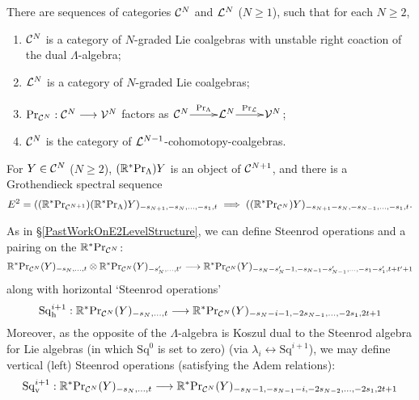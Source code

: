 \documentclass[11pt]{article}
\newcommand{\Sq}{\mathrm{Sq}}
\begin{document}
\begin{prop}
There are sequences of categories $\mathcal{C}^N$ and $\mathcal{L}^N$ ($N\geq1$), such that for each $N\geq2$, 
\begin{enumerate}\squishlist
\setlength{\parindent}{.25in}
\item $\mathcal{C}^N$ is a category of $N$-graded Lie coalgebras with unstable right coaction of the dual $\Lambda$-algebra;
\item $\mathcal{L}^N$ is a category of $N$-graded Lie coalgebras;
\item $\textup{Pr}_{\mathcal{C}^N}:\mathcal{C}^N\longrightarrow\mathcal{V}^N$ factors as $\xymatrix@R=4mm@1{
\calC^N\ar[r]^-{\textup{Pr}_\Lambda}
&%
\calL^N\ar[r]^-{\textup{Pr}_\calL}
&%
\calV^N%
}$;
\item $\mathcal{C}^N$ is the category of $\mathcal{L}^{N-1}$-cohomotopy-coalgebras.
\end{enumerate}
For $Y\in\mathcal{C}^N$ ($N\geq2$), $(\mathbb{R}^*\textup{Pr}_\Lambda)Y$ is an object of $\mathcal{C}^{N+1}$, and there is a Grothendieck spectral sequence
\[E^2=((\mathbb{R}^{*}\textup{Pr}_{\mathcal{C}^{N+1}})(\mathbb{R}^*\textup{Pr}_\Lambda)Y)_{-s_{N+1},-s_N,\ldots,-s_1,t}\implies ((\mathbb{R}^{*}\textup{Pr}_{\mathcal{C}^{N}})Y)_{-s_{N+1}-s_N,-s_{N-1},\ldots,-s_1,t}.\]
%
%
%
\end{prop}
As in \S\ref{PastWorkOnE2LevelStructure}, we can define Steenrod operations and a pairing on the $\mathbb{R}^*\textup{Pr}_{\mathcal{C}^N}$:
\[\mathbb{R}^*\textup{Pr}_{\mathcal{C}^N}(Y)_{-s_{N},\ldots,t}\otimes \mathbb{R}^*\textup{Pr}_{\mathcal{C}^N}(Y)_{-s_{N}',\ldots,t'}\longrightarrow \mathbb{R}^*\textup{Pr}_{\mathcal{C}^N}(Y)_{-s_{N}-s_{N}'-1,-s_{N-1}-s_{N-1}',\ldots,-s_1-s_1',t+t'+1}\]
along with horizontal `Steenrod operations'
\[\Sq^{i+1}_\textup{h}:\mathbb{R}^*\textup{Pr}_{\calC^N}(Y)_{-s_{N},\ldots,t} \to \mathbb{R}^*\textup{Pr}_{\calC^N}(Y)_{-s_{N}-i-1,-2s_{N-1},\ldots,-2s_1,2t+1}\]
Moreover, as the opposite of the $\Lambda$-algebra is Koszul dual to the Steenrod algebra for Lie algebras (in which $\Sq^0$ is set to zero) (via $\lambda_i\leftrightarrow \Sq^{i+1}$), we may define vertical (left) Steenrod operations (satisfying the Adem relations):
\[\Sq^{i+1}_\textup{v}:\mathbb{R}^*\textup{Pr}_{\calC^N}(Y)_{-s_{N},\ldots,t} \to \mathbb{R}^*\textup{Pr}_{\calC^N}(Y)_{-s_{N}-1,-s_{N-1}-i,-2s_{N-2},\ldots,-2s_1,2t+1}\]
\end{document}
